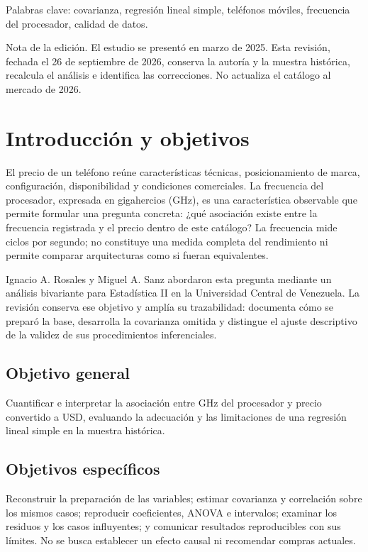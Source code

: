 \documentclass[12pt,letterpaper]{article}
\begin{document}
Palabras clave: covarianza, regresión lineal simple, teléfonos móviles, frecuencia del procesador, calidad de datos.

Nota de la edición. El estudio se presentó en marzo de 2025. Esta revisión, fechada el 26 de septiembre de 2026, conserva la autoría y la muestra histórica, recalcula el análisis e identifica las correcciones. No actualiza el catálogo al mercado de 2026.

\clearpage
\section*{Introducción y objetivos}
El precio de un teléfono reúne características técnicas, posicionamiento de marca, configuración, disponibilidad y condiciones comerciales. La frecuencia del procesador, expresada en gigahercios (GHz), es una característica observable que permite formular una pregunta concreta: ¿qué asociación existe entre la frecuencia registrada y el precio dentro de este catálogo? La frecuencia mide ciclos por segundo; no constituye una medida completa del rendimiento ni permite comparar arquitecturas como si fueran equivalentes.

Ignacio A. Rosales y Miguel A. Sanz abordaron esta pregunta mediante un análisis bivariante para Estadística II en la Universidad Central de Venezuela. La revisión conserva ese objetivo y amplía su trazabilidad: documenta cómo se preparó la base, desarrolla la covarianza omitida y distingue el ajuste descriptivo de la validez de sus procedimientos inferenciales.

\subsection*{Objetivo general}
Cuantificar e interpretar la asociación entre GHz del procesador y precio convertido a USD, evaluando la adecuación y las limitaciones de una regresión lineal simple en la muestra histórica.

\subsection*{Objetivos específicos}
Reconstruir la preparación de las variables; estimar covarianza y correlación sobre los mismos casos; reproducir coeficientes, ANOVA e intervalos; examinar los residuos y los casos influyentes; y comunicar resultados reproducibles con sus límites. No se busca establecer un efecto causal ni recomendar compras actuales.
\end{document}
